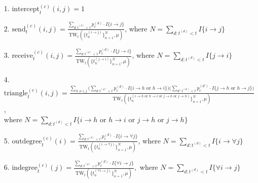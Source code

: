 \documentclass[a4paper]{article}
\begin{document}
 \begin{itemize}
 	\item [1.] $\mbox{intercept}^{(c)}_t(i, j) = 1$
 	\item [2.]  $\mbox{send}^{(c)}_t(i, j)= \frac{\sum\limits_{d: t^{(d)}<t}p_c^{(d)}\cdot I\{i\rightarrow j\}}{\mbox{TW}_t(\{t_n^{(i\rightarrow j)}\}_{n=1}^N, \mu) }$, where $N = \sum\limits_{d: t^{(d)}<t} I\{i\rightarrow j\}$
 	\item [3.] $\mbox{receive}^{(c)}_t(i, j)=\frac{\sum\limits_{d: t^{(d)}<t}p_c^{(d)}\cdot I\{j\rightarrow i\}}{\mbox{TW}_t(\{t_n^{(j\rightarrow i)}\}_{n=1}^N, \mu) }$, where $N = \sum\limits_{d: t^{(d)}<t} I\{j\rightarrow i\}$
 	\item [4.] $\mbox{triangle}^{(c)}_t(i, j)=\frac{\sum\limits_{h \neq i, j}\Big(\sum\limits_{d: t^{(d)}<t}p_c^{(d)}\cdot I\{i\rightarrow h \mbox{ or } h\rightarrow i\}\Big)\Big(\sum\limits_{d': t^{(d')}<t}p_c^{(d')}\cdot I\{j\rightarrow h \mbox{ or } h\rightarrow j\}\Big)}{\mbox{TW}_t(\{t_n^{(i\rightarrow h \mbox{ or } h\rightarrow i \mbox{ or } j\rightarrow h \mbox{ or } j\rightarrow h)}\}_{n=1}^N, \mu) }$, \\where $N = \sum\limits_{d: t^{(d)}<t} I\{i\rightarrow h \mbox{ or } h\rightarrow i \mbox{ or } j\rightarrow h \mbox{ or } j\rightarrow h\}$
 	\item [5.]  $\mbox{outdegree}^{(c)}_t(i)=\frac{\sum\limits_{d: t^{(d)}<t}p_c^{(d)}\cdot I\{i\rightarrow \forall j\}}{\mbox{TW}_t(\{t_n^{(i\rightarrow \forall j)}\}_{n=1}^N, \mu) }$, where $N = \sum\limits_{d: t^{(d)}<t} I\{i\rightarrow \forall j\}$
 	\item [6.] $\mbox{indegree}^{(c)}_t(j)=\frac{\sum\limits_{d: t^{(d)}<t}p_c^{(d)}\cdot I\{\forall i\rightarrow j\}}{\mbox{TW}_t(\{t_n^{(\forall i\rightarrow  j)}\}_{n=1}^N, \mu)}, $ where $N = \sum\limits_{d: t^{(d)}<t} I\{\forall i\rightarrow j\}$
 \end{itemize}
\fi
\end{document}
